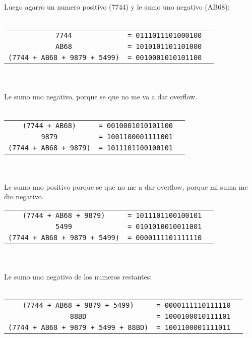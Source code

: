 \documentclass[12pt]{article}
\begin{document}
Luego agarro un numero positivo (7744) y le sumo uno negativo (AB68): \\ \\

\begin{tabular}{c c c}
\texttt{7744}                        & \texttt{= 0111011101000100} \\
\texttt{AB68}                        & \texttt{= 1010101101101000}\\
\texttt{(7744 + AB68 + 9879 + 5499)} & \texttt{= 0010001010101100}
\end{tabular} \\ \\

Le sumo uno negativo, porque se que no me va a dar overflow. \\ \\

\begin{tabular}{c c c}
\texttt{(7744 + AB68)}        & \texttt{= 0010001010101100} \\
\texttt{9879}                 & \texttt{= 1001100001111001}\\
\texttt{(7744 + AB68 + 9879)} & \texttt{= 1011101100100101}
\end{tabular} \\ \\

Le sumo uno positivo porque se que no me a dar overflow, porque mi suma me dio negativo. \\

\begin{tabular}{c c c}
\texttt{(7744 + AB68 + 9879)}       & \texttt{= 1011101100100101} \\
\texttt{5499}                       & \texttt{= 0101010010011001} \\
\texttt{(7744 + AB68 + 9879 + 5499)}& \texttt{= 0000111101111110}
\end{tabular} \\ \\

Le sumo uno negativo de los numeros restantes: \\ \\

\begin{tabular}{c c c}
\texttt{(7744 + AB68 + 9879 + 5499)} & \texttt{= 0000111110111110} \\
\texttt{88BD}                        & \texttt{= 1000100010111101} \\
\texttt{(7744 + AB68 + 9879 + 5499 + 88BD)} & \texttt{= 1001100001111011}
\end{tabular} \\ \\
\end{document}
